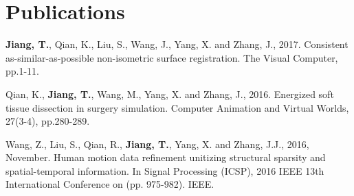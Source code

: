 
\section*{Publications}
\label{sec:publications}
\indent

\textbf{Jiang, T.}, Qian, K., Liu, S., Wang, J., Yang, X. and Zhang, J., 2017. Consistent as-similar-as-possible non-isometric surface registration. The Visual Computer, pp.1-11.

Qian, K., \textbf{Jiang, T.}, Wang, M., Yang, X. and Zhang, J., 2016. Energized soft tissue dissection in surgery simulation. Computer Animation and Virtual Worlds, 27(3-4), pp.280-289.

Wang, Z., Liu, S., Qian, R., \textbf{Jiang, T.}, Yang, X. and Zhang, J.J., 2016, November. Human motion data refinement unitizing structural sparsity and spatial-temporal information. In Signal Processing (ICSP), 2016 IEEE 13th International Conference on (pp. 975-982). IEEE.

\pagebreak
